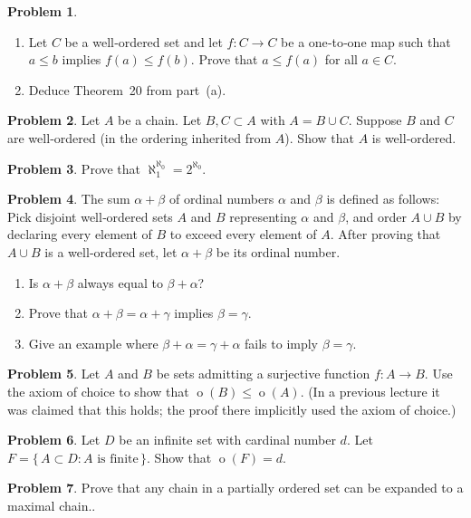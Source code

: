 \documentclass[10pt]{article}
\theoremstyle{definition} %
\newtheorem{problem}{Problem}
\theoremstyle{plain} %
\begin{document}
\begin{problem}
  \begin{enumerate}[label=(\alph*)]
      \item Let $C$ be a well‑ordered set and let $f : C \to C$ be a one‑to‑one map such that
            $a \le b$ implies $f(a) \le f(b)$.  
            Prove that $a \le f(a)$ for all $a \in C$.
      \item Deduce Theorem 20 from part (a).
  \end{enumerate}
\end{problem}

\begin{problem}
  Let $A$ be a chain.  Let $B, C \subset A$ with $A = B \cup C$.  
  Suppose $B$ and $C$ are well‑ordered (in the ordering inherited from $A$).  
  Show that $A$ is well‑ordered.
\end{problem}
\begin{problem}
  Prove that $\aleph_{1}^{\aleph_{0}} = 2^{\aleph_{0}}$.
\end{problem}

\begin{problem}
  The sum $\alpha + \beta$ of ordinal numbers $\alpha$ and $\beta$ is defined as follows:  
  Pick disjoint well‑ordered sets $A$ and $B$ representing $\alpha$ and $\beta$, and order $A \cup B$ by declaring every element of $B$ to exceed every element of $A$.  
  After proving that $A \cup B$ is a well‑ordered set, let $\alpha + \beta$ be its ordinal number.
  \begin{enumerate}[label=(\alph*)]
      \item Is $\alpha + \beta$ always equal to $\beta + \alpha$?
      \item Prove that $\alpha + \beta = \alpha + \gamma$ implies $\beta = \gamma$.
      \item Give an example where $\beta + \alpha = \gamma + \alpha$ fails to imply $\beta = \gamma$.
  \end{enumerate}
\end{problem}

\begin{problem}
  Let $A$ and $B$ be sets admitting a surjective function $f : A \to B$.  
  Use the axiom of choice to show that $\operatorname{o}(B) \le \operatorname{o}(A)$.  
  (In a previous lecture it was claimed that this holds; the proof there implicitly used the axiom of choice.)
\end{problem}

\begin{problem}
  Let $D$ be an infinite set with cardinal number $d$.  
  Let $F = \{\,A \subset D : A \text{ is finite}\,\}$.  
  Show that $\operatorname{o}(F) = d$.
\end{problem}
\begin{problem}
  Prove that any chain in a partially ordered set can be expanded to a maximal chain..
\end{problem}
\end{document}
